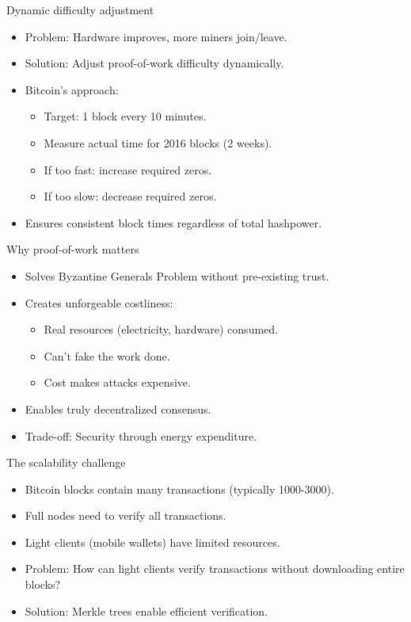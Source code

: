 \documentclass[aspectratio=169, lualatex, handout]{beamer}
\begin{document}
\begin{frame}{Dynamic difficulty adjustment}
	\begin{itemize}
		\item Problem: Hardware improves, more miners join/leave.
		\item Solution: Adjust proof-of-work difficulty dynamically.
		\item Bitcoin's approach:
		      \begin{itemize}
			      \item Target: 1 block every 10 minutes.
			      \item Measure actual time for 2016 blocks (2 weeks).
			      \item If too fast: increase required zeros.
			      \item If too slow: decrease required zeros.
		      \end{itemize}
		\item Ensures consistent block times regardless of total hashpower.
	\end{itemize}
\end{frame}

\begin{frame}{Why proof-of-work matters}
	\begin{itemize}
		\item Solves Byzantine Generals Problem without pre-existing trust.
		\item Creates unforgeable costliness:
		      \begin{itemize}
			      \item Real resources (electricity, hardware) consumed.
			      \item Can't fake the work done.
			      \item Cost makes attacks expensive.
		      \end{itemize}
		\item Enables truly decentralized consensus.
		\item Trade-off: Security through energy expenditure.
	\end{itemize}
\end{frame}

\begin{frame}{The scalability challenge}
	\begin{itemize}
		\item Bitcoin blocks contain many transactions (typically 1000-3000).
		\item Full nodes need to verify all transactions.
		\item Light clients (mobile wallets) have limited resources.
		\item Problem: How can light clients verify transactions without downloading entire blocks?
		\item Solution: Merkle trees enable efficient verification.
	\end{itemize}
\end{frame}
\end{document}

